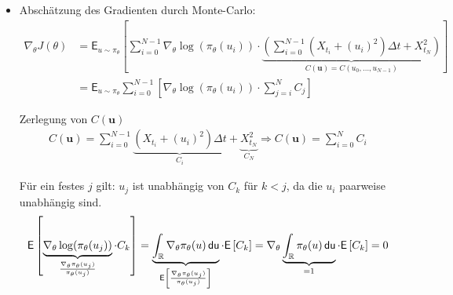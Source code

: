 \documentclass[a4paper, 12pt]{scrartcl}
\newcommand{\du}{\thinspace \mathsf{du}}
\begin{document}
\begin{beispiel}
\begin{itemize}
        \item[5.] Abschätzung des Gradienten durch Monte-Carlo:
        \begin{align*}
            \nabla_{\theta} J(\theta)
            &=
            \mathsf{E}_{u \sim \pi_{\theta}}
            \left[
                \sum_{i=0}^{N-1}
                \nabla_{\theta}
                \log(\pi_{\theta}(u_{i}))
                \cdot
                \underbrace{
                    \left(
                        \sum_{i=0}^{N-1}
                        \left(
                            X_{t_i} + (u_{i})^2
                        \right) \Delta t 
                        + X_{t_N}^2
                    \right)
                }_{
                    C(\bm{u}) = C(u_0, \ldots, u_{N-1})
                }
            \right]
            \\
            &=
            \mathsf{E}_{u \sim \pi_{\theta}}
            \sum_{i=0}^{N-1}
            \left[
                \nabla_{\theta}
                \log(\pi_{\theta}(u_{i}))
                \cdot
                \sum_{j=i}^{N}
                C_j
            \right]
        \end{align*}

        Zerlegung von $C(\bm{u})$
        \begin{align*}
            C(\bm{u})
            =
            \sum_{i=0}^{N-1}
            \underbrace{
                \left(
                    X_{t_i} + (u_{i})^2
                \right) \Delta t }_{C_i}
            + 
            \underbrace{X_{t_N}^2}_{C_N}
            \Rightarrow
            C(\bm{u})
            = \sum_{i=0}^{N} C_i
        \end{align*}

        Für ein festes $j$ gilt: $u_j$ ist unabhängig von $C_k$ für $k < j$, 
        da die $u_i$ paarweise unabhängig sind.
        \begin{align*}
            \mathsf{E}
            \left[
                \underbrace{
                    \nabla_{\theta}
                    \log(\pi_{\theta}(u_{j}))
                }_{
                    \frac{\nabla_{\theta} \pi_{\theta}(u_j)}{\pi_{\theta}(u_j)}
                }
                \cdot
                C_k
            \right]
            =
            \underbrace{
                \int_{\mathbb{R}} \nabla_{\theta} \pi_{\theta}(u) \du
            }_{
                \mathsf{E}
                \left[
                    \frac{\nabla_{\theta} \pi_{\theta}(u_j)}{\pi_{\theta}(u_j)}
                \right]
            }
            \cdot
            \mathsf{E}
            \left[
                C_k
            \right]
            = 
            \nabla_{\theta}
            \underbrace{
                \int_{\mathbb{R}} \pi_{\theta}(u) \du
            }_{
                = 1
            }
            \cdot
            \mathsf{E}
            \left[
                C_k
            \right]
            = 0
        \end{align*}


\end{itemize}
\end{beispiel}
\end{document}
